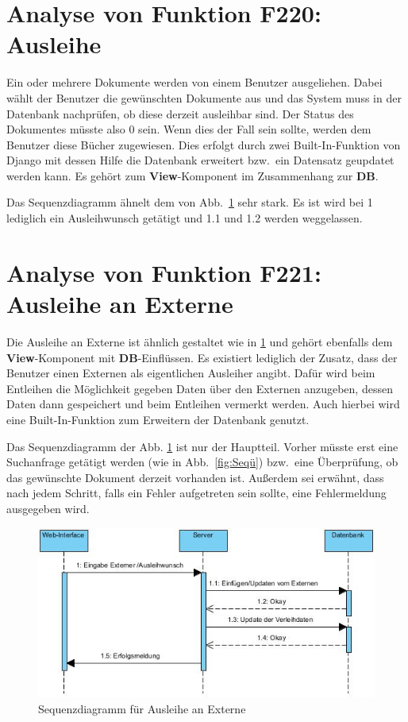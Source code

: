 \section{Analyse von Funktion F220: Ausleihe}
\label{f:220}
Ein oder mehrere Dokumente werden von einem Benutzer ausgeliehen. Dabei wählt der Benutzer die gewünschten Dokumente aus und das System muss in der Datenbank nachprüfen, ob diese derzeit ausleihbar sind. Der Status des Dokumentes müsste also 0 sein. Wenn dies der Fall sein sollte, werden dem Benutzer diese Bücher zugewiesen. Dies erfolgt durch zwei Built-In-Funktion von Django mit dessen Hilfe die Datenbank erweitert bzw.\ ein Datensatz geupdatet werden kann. Es gehört zum \textbf{View}-Komponent im Zusammenhang zur \textbf{DB}.

Das Sequenzdiagramm ähnelt dem von Abb.\ \ref{fig:221} sehr stark. Es ist wird bei 1 lediglich ein Ausleihwunsch getätigt und 1.1 und 1.2 werden weggelassen. 

\section{Analyse von Funktion F221: Ausleihe an Externe}
\label{f:221}
Die Ausleihe an Externe ist ähnlich gestaltet wie in \ref{f:220}  und gehört ebenfalls dem \textbf{View}-Komponent mit \textbf{DB}-Einflüssen. Es existiert lediglich der Zusatz, dass der Benutzer einen Externen als eigentlichen Ausleiher angibt. Dafür wird beim Entleihen die Möglichkeit gegeben Daten über den Externen anzugeben, dessen Daten dann gespeichert und beim Entleihen vermerkt werden. Auch hierbei wird eine Built-In-Funktion zum Erweitern der Datenbank genutzt.

Das Sequenzdiagramm der Abb. \ref{fig:221} ist nur der Hauptteil. Vorher müsste erst eine Suchanfrage getätigt werden (wie in Abb.\ \ref{fig:Seqü}) bzw.\ eine Überprüfung, ob das gewünschte Dokument derzeit vorhanden ist. Außerdem sei erwähnt, dass nach jedem Schritt, falls ein Fehler aufgetreten sein sollte, eine Fehlermeldung ausgegeben wird.
\begin{figure}
\includegraphics[width=0.8\linewidth]{bilder/Seq-Ausleihe.jpg}
\caption{Sequenzdiagramm für Ausleihe an Externe}
\label{fig:221}
\end{figure}


